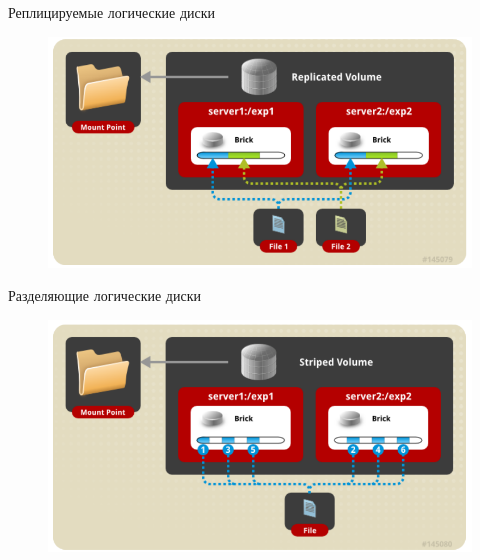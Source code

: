 \documentclass{beamer}
\begin{document}
\begin{frame}{Реплицируемые логические диски}
	\begin{figure}[h]
		\centering
		\includegraphics[width=0.8\linewidth]{replicated.png}
	\end{figure}
\end{frame}

\begin{frame}{Разделяющие логические диски}
	\begin{figure}[h]
		\centering
		\includegraphics[width=0.8\linewidth]{striped.png}
	\end{figure}
\end{frame}
\end{document}
